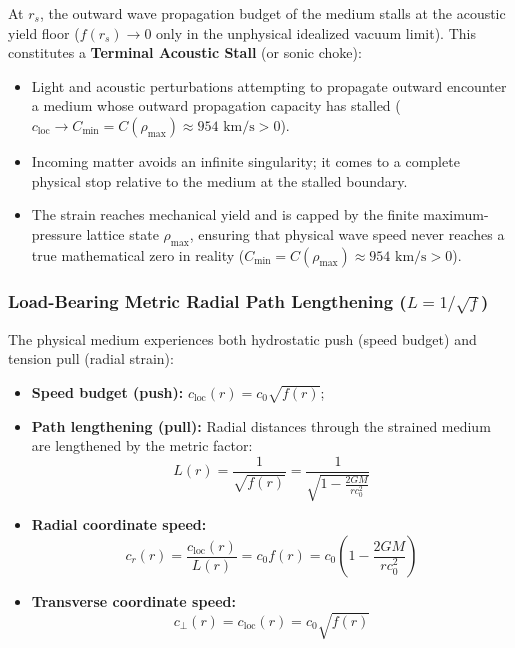 \documentclass[11pt,a4paper]{article}
\begin{document}
At $r_s$, the outward wave propagation budget of the medium stalls at the acoustic yield floor ($f(r_s) \to 0$ only in the unphysical idealized vacuum limit). This constitutes a \textbf{Terminal Acoustic Stall} (or sonic choke):
\begin{itemize}
    \item Light and acoustic perturbations attempting to propagate outward encounter a medium whose outward propagation capacity has stalled ($c_{\text{loc}} \to C_{\min} = C(\rho_{\max}) \approx 954\text{ km/s} > 0$).
    \item Incoming matter avoids an infinite singularity; it comes to a complete physical stop relative to the medium at the stalled boundary.
    \item The strain reaches mechanical yield and is capped by the finite maximum-pressure lattice state $\rho_{\max}$, ensuring that physical wave speed never reaches a true mathematical zero in reality ($C_{\min} = C(\rho_{\max}) \approx 954\text{ km/s} > 0$).
\end{itemize}

\subsubsection{Load-Bearing Metric Radial Path Lengthening ($L = 1/\sqrt{f}$)}
\label{subsubsec:path_lengthening}

The physical medium experiences both hydrostatic push (speed budget) and tension pull (radial strain):
\begin{itemize}
    \item \textbf{Speed budget (push):} $c_{\text{loc}}(r) = c_0 \sqrt{f(r)}$;
    \item \textbf{Path lengthening (pull):} Radial distances through the strained medium are lengthened by the metric factor:
    \begin{equation}
    L(r) = \frac{1}{\sqrt{f(r)}} = \frac{1}{\sqrt{1 - \frac{2GM}{r c_0^2}}}
    \end{equation}
    \item \textbf{Radial coordinate speed:}
    \begin{equation}
    c_r(r) = \frac{c_{\text{loc}}(r)}{L(r)} = c_0 f(r) = c_0 \left( 1 - \frac{2GM}{r c_0^2} \right)
    \end{equation}
    \item \textbf{Transverse coordinate speed:}
    \begin{equation}
    c_\perp(r) = c_{\text{loc}}(r) = c_0 \sqrt{f(r)}
    \end{equation}
\end{itemize}
\end{document}
